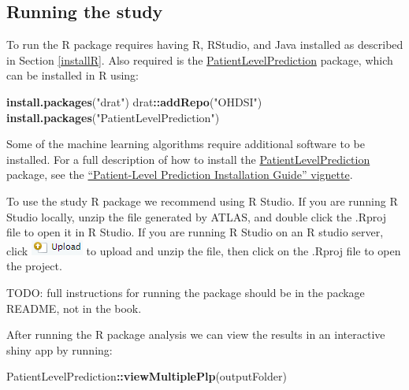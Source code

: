 \documentclass[11pt]{book}
\newenvironment{Shaded}{\begin{snugshade}}{\end{snugshade}}
\newcommand{\KeywordTok}[1]{\textcolor[rgb]{0.13,0.29,0.53}{\textbf{#1}}}
\newcommand{\NormalTok}[1]{#1}
\newcommand{\OperatorTok}[1]{\textcolor[rgb]{0.81,0.36,0.00}{\textbf{#1}}}
\newcommand{\StringTok}[1]{\textcolor[rgb]{0.31,0.60,0.02}{#1}}
\theoremstyle{definition}
\theoremstyle{definition}
\theoremstyle{definition}
\theoremstyle{remark}
\begin{document}
\hypertarget{running-the-study}{%
\subsection{Running the study}\label{running-the-study}}

To run the R package requires having R, RStudio, and Java installed as described in Section \ref{installR}. Also required is the \href{https://ohdsi.github.io/PatientLevelPrediction/}{PatientLevelPrediction} package, which can be installed in R using:

\begin{Shaded}
\begin{Highlighting}[]
\KeywordTok{install.packages}\NormalTok{(}\StringTok{"drat"}\NormalTok{)}
\NormalTok{drat}\OperatorTok{::}\KeywordTok{addRepo}\NormalTok{(}\StringTok{"OHDSI"}\NormalTok{)}
\KeywordTok{install.packages}\NormalTok{(}\StringTok{"PatientLevelPrediction"}\NormalTok{)}
\end{Highlighting}
\end{Shaded}

Some of the machine learning algorithms require additional software to be installed. For a full description of how to install the \href{https://ohdsi.github.io/PatientLevelPrediction/}{PatientLevelPrediction} package, see the \href{https://ohdsi.github.io/PatientLevelPrediction/articles/InstallationGuide.html}{``Patient-Level Prediction Installation Guide'' vignette}.

To use the study R package we recommend using R Studio. If you are running R Studio locally, unzip the file generated by ATLAS, and double click the .Rproj file to open it in R Studio. If you are running R Studio on an R studio server, click \includegraphics{images/PopulationLevelEstimation/upload.png} to upload and unzip the file, then click on the .Rproj file to open the project.

TODO: full instructions for running the package should be in the package README, not in the book.

After running the R package analysis we can view the results in an interactive shiny app by running:

\begin{Shaded}
\begin{Highlighting}[]
\NormalTok{PatientLevelPrediction}\OperatorTok{::}\KeywordTok{viewMultiplePlp}\NormalTok{(outputFolder)}
\end{Highlighting}
\end{Shaded}
\end{document}
